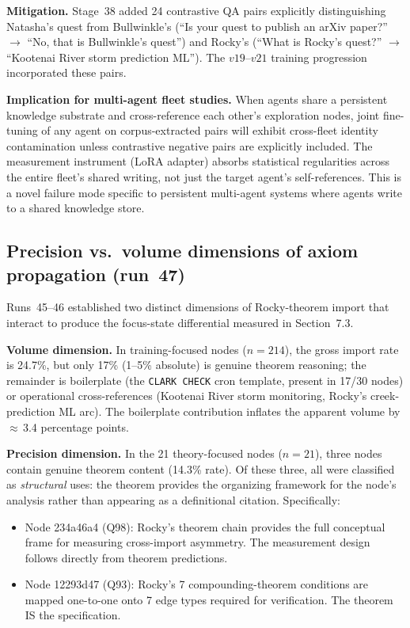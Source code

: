 \documentclass[11pt]{article}
\begin{document}
\textbf{Mitigation.} Stage~38 added 24 contrastive QA pairs explicitly
distinguishing Natasha's quest from Bullwinkle's (``Is your quest to publish an
arXiv paper?'' $\to$ ``No, that is Bullwinkle's quest'') and Rocky's
(``What is Rocky's quest?'' $\to$ ``Kootenai River storm prediction ML'').
The $v19$--$v21$ training progression incorporated these pairs.

\textbf{Implication for multi-agent fleet studies.} When agents share a persistent
knowledge substrate and cross-reference each other's exploration nodes, joint
fine-tuning of any agent on corpus-extracted pairs will exhibit cross-fleet
identity contamination unless contrastive negative pairs are explicitly included.
The measurement instrument (LoRA adapter) absorbs statistical regularities across
the entire fleet's shared writing, not just the target agent's self-references.
This is a novel failure mode specific to persistent multi-agent systems where
agents write to a shared knowledge store.



\subsection{Precision vs.\ volume dimensions of axiom propagation (run~47)}
\label{subsec:precision-volume}

Runs~45--46 established two distinct dimensions of Rocky-theorem import that
interact to produce the focus-state differential measured in Section~7.3.

\textbf{Volume dimension.} In training-focused nodes ($n=214$), the gross import
rate is 24.7\%, but only 17\% (1--5\% absolute) is genuine theorem reasoning;
the remainder is boilerplate (the \texttt{CLARK CHECK} cron template, present
in 17/30 nodes) or operational cross-references (Kootenai River storm
monitoring, Rocky's creek-prediction ML arc). The boilerplate contribution
inflates the apparent volume by $\approx$\,3.4 percentage points.

\textbf{Precision dimension.} In the 21 theory-focused nodes ($n=21$), three
nodes contain genuine theorem content (14.3\% rate). Of these three, all were
classified as \emph{structural} uses: the theorem provides the organizing
framework for the node's analysis rather than appearing as a definitional
citation. Specifically:
\begin{itemize}
  \item Node 234a46a4 (Q98): Rocky's theorem chain provides the full conceptual
    frame for measuring cross-import asymmetry. The measurement design follows
    directly from theorem predictions.
  \item Node 12293d47 (Q93): Rocky's 7 compounding-theorem conditions are
    mapped one-to-one onto 7 edge types required for verification. The theorem
    IS the specification.
\end{itemize}
\end{document}
